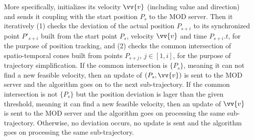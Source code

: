 More specifically, \citt initializes its velocity $\vv{v}$ (including value and direction) and sends it coupling with the start position $P_s$ to the MOD server. Then it iteratively (1) checks the deviation of the actual position $P_{s+i}$ to its synchronized point $P'_{s+i}$ built from the start point $P_s$, velocity $\vv{v}$ and time $P_{s+i}.t$, for the purpose of position tracking, and (2) checks the common intersection of spatio-temporal cones built from points $P_{s+j}$, $j \in [1, i]$, for the purpose of trajectory simplification.
%
If the common intersection is $\{P_s\}$, meaning it can not find a new feasible velocity,
then an update of $(P_s, \vv{v})$ is sent to the MOD server and the algorithm goes on to the next sub-trajectory.
%
If the common intersection is not $\{P_s\}$ but the position deviation is lager than the given threshold, meaning it can find a new feasible velocity, then an update of $\vv{v}$ is sent to the MOD server and the algorithm goes on processing the same sub-trajectory.
%
Otherwise, no deviation occurs, no update is sent and the algorithm goes on processing the same sub-trajectory.



